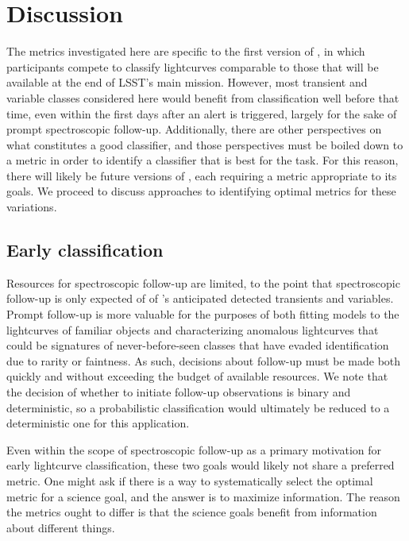 \section{Discussion}
\label{sec:discussion}

The metrics investigated here are specific to the first version of \plasticc, in which participants compete to classify lightcurves comparable to those that will be available at the end of LSST's main mission.
However, most transient and variable classes considered here would benefit from classification well before that time, even within the first days after an alert is triggered, largely for the sake of prompt spectroscopic follow-up.
Additionally, there are other perspectives on what constitutes a good classifier, and those perspectives must be boiled down to a metric in order to identify a classifier that is best for the task.
For this reason, there will likely be future versions of \plasticc, each requiring a metric appropriate to its goals.
We proceed to discuss approaches to identifying optimal metrics for these variations.

\subsection{Early classification}
\label{sec:early}

Resources for spectroscopic follow-up are limited, to the point that spectroscopic follow-up is only expected of  of \lsst's anticipated  detected transients and variables.
Prompt follow-up is more valuable for the purposes of both fitting models to the lightcurves of familiar objects and characterizing anomalous lightcurves that could be signatures of never-before-seen classes that have evaded identification due to rarity or faintness.
As such, decisions about follow-up must be made both quickly and without exceeding the budget of available resources.
We note that the decision of whether to initiate follow-up observations is binary and deterministic, so a probabilistic classification would ultimately be reduced to a deterministic one for this application.

Even within the scope of spectroscopic follow-up as a primary motivation for early lightcurve classification, these two goals would likely not share a preferred metric.
One might ask if there is a way to systematically select the optimal metric for a science goal, and the answer is to maximize information.
The reason the metrics ought to differ is that the science goals benefit from information about different things.

